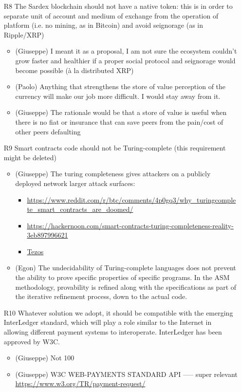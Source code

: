 \begin{itemize}
\item[R8] The Sardex blockchain should not have a native token: this is in order to separate unit of
account and medium of exchange from the operation of platform (i.e. no mining, as in Bitcoin)
and avoid seignorage (as in Ripple/XRP)
\begin{itemize}
	\item (Giuseppe) I meant it as a proposal, I am not sure the ecosystem couldn’t grow faster and healthier if a proper social protocol and seignorage would become possible (à la distributed XRP)
	\item (Paolo) Anything that strengthens the store of value perception of the currency will make our job more difficult. I would stay away from it.
	\item (Giuseppe) The rationale would be that a store of value is useful when there is no fiat or insurance that can save peers from the pain/cost of other peers defaulting
\end{itemize}


\item[R9] Smart contracts code should not be Turing-complete (this requirement might be deleted)
\begin{itemize}
	\item (Giuseppe) The turing completeness gives attackers on a publicly deployed network larger attack surfaces:
	\begin{itemize}
		\item \url{https://www.reddit.com/r/btc/comments/4p0gq3/why_turingcomplete_smart_contracts_are_doomed/}
		\item \url{https://hackernoon.com/smart-contracts-turing-completeness-reality-3eb897996621}
		\item \href{https://www.quora.com/How-is-Tezos-different-from-Ethereum}{Tezos}
	\end{itemize}

	\item (Egon) The undecidability of Turing-complete languages does not prevent the ability to prove specific properties of specific programs. In the ASM methodology, provability is refined along with the specifications as part of the iterative refinement process, down to the actual code.
\end{itemize}


\item[R10] Whatever solution we adopt, it should be compatible with the emerging InterLedger
standard, which will play a role similar to the Internet in allowing different payment
systems to interoperate. InterLedger has been approved by W3C.
\begin{itemize}
	\item (Giuseppe) Not 100%
	\item (Giuseppe) W3C WEB-PAYMENTS STANDARD API ----- super relevant \url{https://www.w3.org/TR/payment-request/}
\end{itemize}



\end{itemize}
